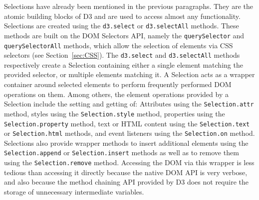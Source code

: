 Selections have already been mentioned in the previous paragraphs.
They are the atomic building blocks of D3 and are used to access almost any functionality.
Selections are created using the \lstinline{d3.select} or \lstinline{d3.selectAll} methods.
These methods are built on the DOM Selectors API, namely the \lstinline{querySelector} and \lstinline{querySelectorAll} methods, which allow the selection of elements via CSS selectors (see Section~\ref{sec:CSS}).
The \lstinline{d3.select} and \lstinline{d3.selectAll} methods respectively create a Selection containing either a single element matching the provided selector, or multiple elements matching it.
A Selection acts as a wrapper container around selected elements to perform frequently performed DOM operations on them.
Among others, the element operations provided by a Selection include the setting and getting of: Attributes using the \lstinline{Selection.attr} method, styles using the \lstinline{Selection.style} method, properties using the \lstinline{Selection.property} method, text or HTML content using the \lstinline{Selection.text} or \lstinline{Selection.html} methods, and event listeners using the \lstinline{Selection.on} method.
Selections also provide wrapper methods to insert additional elements using the \lstinline{Selection.append} or \lstinline{Selection.insert} methods as well as to remove them using the \lstinline{Selection.remove} method.
Accessing the DOM via this wrapper is less tedious than accessing it directly because the native DOM API is very verbose, and also because the method chaining API provided by D3 does not require the storage of unnecessary intermediate variables.

